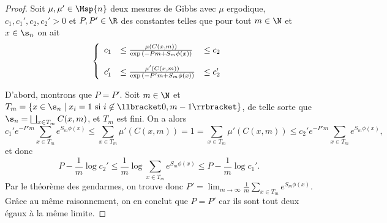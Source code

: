   \begin{proof}
    Soit $\mu, \mu' \in \Msp{n}$ deux mesures de Gibbs avec $\mu$ ergodique, $c_1, c_1', c_2, c_2' > 0$ et $P, P' \in \R$
    des constantes telles que pour tout $m \in \N$ et $x \in \s_n$ on ait
    $$\left\{\begin{array}{lll}
	c_1  &\leq \frac{\mu(C(x,m))}{\exp{(-Pm + S_m\phi(x))}} &\leq c_2 \vspace{1em} \\
	c_1' &\leq \frac{\mu'(C(x,m))}{\exp{(-P'm + S_m\phi(x))}} &\leq c_2'
      \end{array}\right.$$

      D'abord, montrons que $P = P'$.
      Soit $m \in \N$ et $T_m = \left\{x \in \s_n \mid x_i = 1 \text{ si } i \not\in \llbracket 0, m-1 \rrbracket \right\}$,
      de telle sorte que $\s_n = \bigsqcup_{x\in T_m}{C(x,m)}$, et $T_m$ est fini.
      On a alors
      $$c_1'e^{-P'm}\sum_{x\in T_m}{e^{S_m\phi(x)}} \leq \sum_{x\in T_m}{\mu'(C(x,m))}
            = 1 = \sum_{x\in T_m}{\mu'(C(x, m))} \leq c_2'e^{-P'm}\sum_{x\in T_m}{e^{S_m\phi(x)}},$$
      et donc
      $$P - \frac 1 m \log{c_2'} \leq \frac 1 m \log{\sum_{x\in T_m}{e^{S_m\phi(x)}}} \leq P - \frac 1 m \log{c_1'}.$$
      Par le théorème des gendarmes, on trouve donc $P' = \lim_{m\to\infty}{\frac 1 m\sum_{x\in T_m}{e^{S_m\phi(x)}}}$.
      Grâce au même raisonnement, on en conclut que $P = P'$ car ils sont tout deux égaux à la même limite.


\end{proof}
